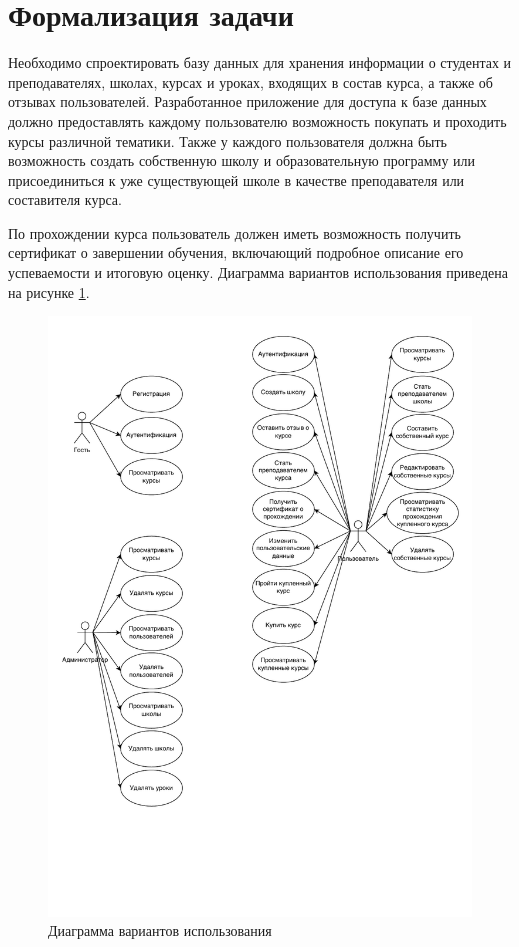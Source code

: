 \section{Формализация задачи}
Необходимо спроектировать базу данных для хранения информации о студентах и преподавателях, школах, курсах и уроках, входящих в состав курса, а также об отзывах пользователей.
Разработанное приложение для доступа к базе данных должно предоставлять каждому пользователю возможность покупать и проходить курсы различной тематики. Также у каждого пользователя должна быть возможность создать собственную школу и образовательную программу
или присоединиться к уже существующей школе в качестве преподавателя или составителя курса.

По прохождении курса пользователь должен иметь возможность получить сертификат о завершении обучения,
включающий подробное описание его успеваемости и итоговую оценку. Диаграмма вариантов использования приведена на рисунке \ref{img:usecase}.

\begin{figure}[H]
	\centering
	\includegraphics[height=0.7\textheight]{inc/img/usecase.pdf}
	\caption{Диаграмма вариантов использования}
	\label{img:usecase}
\end{figure}

